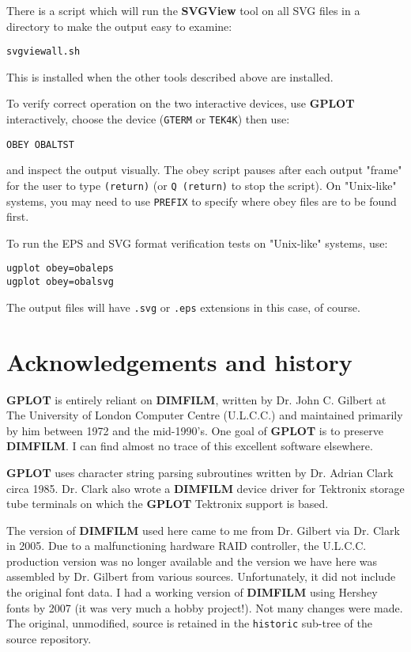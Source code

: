 \documentclass[a4paper,twoside,11pt]{article}
\newcommand{\newpara}{\par\vspace{4mm}\noindent}
\begin{document}
\newpara
There is a script which will run the \textbf{SVGView} tool on all SVG
files in a directory to make the output easy to examine:
\begin{lstlisting}
svgviewall.sh
\end{lstlisting}
This is installed when the other tools described above are
installed.

\newpara
To verify correct operation on the two interactive devices,
use \textbf{GPLOT} interactively, choose the device
(\texttt{GTERM} or \texttt{TEK4K}) then use:
\begin{lstlisting}
OBEY OBALTST
\end{lstlisting}
and inspect the output visually. The obey script pauses
after each output "frame" for the user to type \texttt{(return)}
(or \texttt{Q (return)} to stop the script). On "Unix-like"
systems, you may need to use \texttt{PREFIX} to specify where obey
files are to be found first.

\newpara
To run the EPS and SVG format verification tests on
"Unix-like" systems, use:
\begin{lstlisting}
ugplot obey=obaleps
ugplot obey=obalsvg
\end{lstlisting}

\newpara
The output files will have \texttt{.svg} or \texttt{.eps} extensions in 
this case, of course.



\section{Acknowledgements and history}
\newpara
\textbf{GPLOT} is entirely reliant on \textbf{DIMFILM}, written by Dr. John C. Gilbert at The University of London
Computer Centre (U.L.C.C.) and maintained primarily by him between 1972 and the mid-1990's. One goal of \textbf{GPLOT} is to
preserve \textbf{DIMFILM}. I can find almost no trace of this excellent software elsewhere.

\newpara
\textbf{GPLOT} uses character
string parsing subroutines written by Dr. Adrian Clark circa 1985. Dr. Clark also wrote a \textbf{DIMFILM} device
driver for Tektronix storage tube terminals on which the \textbf{GPLOT} Tektronix support
is based.

\newpara
The version of \textbf{DIMFILM} used here came to me from Dr. Gilbert via Dr. Clark in 2005. Due to a malfunctioning hardware
RAID controller, the U.L.C.C. production version was no longer available and the version we have here
was assembled by Dr. Gilbert from various sources. Unfortunately, it did not include the original font data. I had a
working version of \textbf{DIMFILM} using Hershey fonts by 2007 (it was very much a hobby project!). Not many changes were made.
The original, unmodified, source is retained in the \texttt{historic} sub-tree of the source repository.
\end{document}
